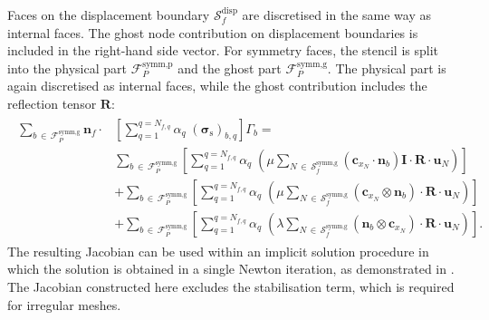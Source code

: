 \documentclass[review,3p]{elsarticle}
\newcommand{\bb}{\boldsymbol}
\begin{document}
%
Faces on the displacement boundary $\mathcal{S}_f^{\text{disp}}$ are discretised in the same way as internal faces.
The ghost node contribution on displacement boundaries is included in the right-hand side vector.
For symmetry faces, the stencil is split into the physical part $\mathcal{F}_P^{\text{symm,p}}$ and the ghost part $\mathcal{F}_P^{\text{symm,g}}$.
The physical part is again discretised as internal faces, while the ghost contribution includes the reflection tensor $\bb{R}$:
%
\begin{eqnarray}
	\begin{split}
		\sum_{b \,\in\, \mathcal{F}_P^{\text{symm,g}}} \bb{n}_{f} \cdot &\left[  \sum_{q=1}^{q=N_{f,q}}\alpha_q \; (\bb{\sigma}_\text{s})_{b,q} \right] \Gamma_b 
		= \\
		& \sum_{b \,\in\, \mathcal{F}_P^{\text{symm,g}}} \left [ \sum_{q=1}^{q=N_{f,q}}\alpha_q \; \left(\mu \sum_{N\,\in\,\mathcal{S}_f^{\text{symm,g}}}(\bb{c}_{x_N}\cdot \bb{n}_b)\bb{I}\cdot \bb{R} \cdot \bb{u}_N  \right) \right] 
		\\
		&  
		+\sum_{b \,\in\, \mathcal{F}_P^{\text{symm,g}}} \left [ \sum_{q=1}^{q=N_{f,q}}\alpha_q \; \left(\mu \sum_{N\,\in\,\mathcal{S}_f^{\text{symm,g}}}(\bb{c}_{x_N} \otimes \bb{n}_b) \cdot \bb{R} \cdot \bb{u}_N  \right) \right] \\
		& 
		+\sum_{b \,\in\, \mathcal{F}_P^{\text{symm,g}}} \left [ \sum_{q=1}^{q=N_{f,q}}\alpha_q \; \left(\lambda \sum_{N\,\in\,\mathcal{S}_f^{\text{symm,g}}}(\bb{n}_b \otimes \bb{c}_{x_N}) \cdot \bb{R} \cdot \bb{u}_N \right) \right] .
	\end{split}
\end{eqnarray}
%
The resulting Jacobian can be used within an implicit solution procedure in which the solution is obtained in a single Newton iteration, as demonstrated in \cite{Castrillo2022}.
The Jacobian constructed here excludes the stabilisation term, which is required for irregular meshes. 
%
%
%
\end{document}
